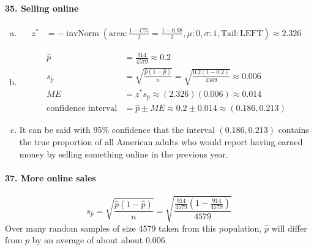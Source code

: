 \documentclass[12pt, A4]{article}
\DeclareMathOperator{\invNorm}{invNorm}
\newcommand{\invNormal}[4]{\invNorm\left(\mathrm{area}:#1, \mu: #2, \sigma: #3, \mathrm{Tail: #4}\right)}
\newcommand{\propse}[2]{\sqrt{\frac{#1\left(1 - #1\right)}{#2}}}
\begin{document}
		\paragraph{35. Selling online}
			\begin{enumerate}[a.]
				\item
					\begin{align*}
						z^*  &= -\invNormal{\frac{1 - C\%}{2} = \frac{1 - 0.98}{2}}{0}{1}{LEFT} \approx 2.326
					\end{align*}
				\item
					\begin{align*}
						\hat{p} &= \frac{914}{4579} \approx 0.2 \\
						s_{\hat{p}} &= \propse{\hat{p}}{n} = \propse{0.2}{4569} \approx 0.006\\
						ME &= z^*s_{\hat{p}} \approx (2.326)(0.006) \approx 0.014 \\
						\text{confidence interval} &= \hat{p} \pm ME \approx 0.2 \pm 0.014 \approx (0.186, 0.213)
					\end{align*}
				\item
					It can be said with 95\% confidence that the interval $(0.186, 0.213)$ contains the true proportion of all American adults who would report having earned money by selling something online in the previous year.
			\end{enumerate}
		\paragraph{37. More online sales}
			\[
				s_{\hat{p}} = \propse{\hat{p}}{n} = \propse{\frac{914}{4579}}{4579}
			\]
			Over many random samples of size 4579 taken from this population, $\hat{p}$ will differ from $p$ by an average of about about 0.006.
\end{document}
